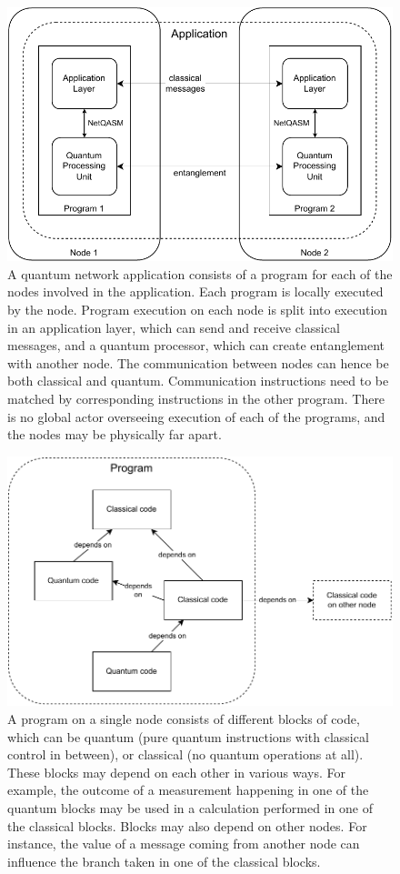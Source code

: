 \begin{figure}[t]
    \centering
    \includegraphics[width=0.6\linewidth]{figures/netqasm/multi_program_app_2.pdf}
    \caption{A quantum network application consists of a program for each of the nodes involved in the application.
        Each program is locally executed by the node.
        Program execution on each node is split into execution in an application layer, which can send and receive classical messages, and a quantum processor, which can create entanglement with another node.
        The communication between nodes can hence be both classical and quantum.
        Communication instructions need to be matched by corresponding instructions in the other program.
        There is no global actor overseeing execution of each of the programs, and the nodes may be physically far apart.}
    \label{fig:app_programs}
\end{figure}

\begin{figure}[t]
    \centering
    \includegraphics[width=0.6\linewidth]{figures/netqasm/program_decomp.pdf}
    \caption{A program on a single node consists of different blocks of code, which can be quantum (pure quantum instructions with classical control in between), or classical (no quantum operations at all).
        These blocks may depend on each other in various ways.
        For example, the outcome of a measurement happening in one of the quantum blocks may be used in a calculation performed in one of the classical blocks.
        Blocks may also depend on other nodes.
        For instance, the value of a message coming from another node can influence the branch taken in one of the classical blocks.}
    \label{fig:program_decomp}
\end{figure}


